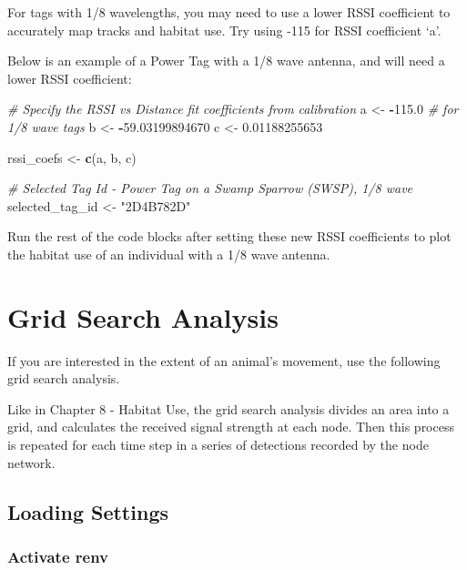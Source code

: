 \documentclass[
]{book}
\newenvironment{Shaded}{\begin{snugshade}}{\end{snugshade}}
\newcommand{\CommentTok}[1]{\textcolor[rgb]{0.56,0.35,0.01}{\textit{#1}}}
\newcommand{\FloatTok}[1]{\textcolor[rgb]{0.00,0.00,0.81}{#1}}
\newcommand{\FunctionTok}[1]{\textcolor[rgb]{0.13,0.29,0.53}{\textbf{#1}}}
\newcommand{\NormalTok}[1]{#1}
\newcommand{\OtherTok}[1]{\textcolor[rgb]{0.56,0.35,0.01}{#1}}
\newcommand{\SpecialCharTok}[1]{\textcolor[rgb]{0.81,0.36,0.00}{\textbf{#1}}}
\newcommand{\StringTok}[1]{\textcolor[rgb]{0.31,0.60,0.02}{#1}}
\begin{document}
For tags with 1/8 wavelengths, you may need to use a lower RSSI coefficient to accurately map tracks and habitat use. Try using -115 for RSSI coefficient `a'.

Below is an example of a Power Tag with a 1/8 wave antenna, and will need a lower RSSI coefficient:

\begin{Shaded}
\begin{Highlighting}[]
\CommentTok{\# Specify the RSSI vs Distance fit coefficients from calibration}
\NormalTok{a }\OtherTok{\textless{}{-}} \SpecialCharTok{{-}}\FloatTok{115.0} \CommentTok{\# for 1/8 wave tags}
\NormalTok{b }\OtherTok{\textless{}{-}} \SpecialCharTok{{-}}\FloatTok{59.03199894670}
\NormalTok{c }\OtherTok{\textless{}{-}} \FloatTok{0.01188255653}

\NormalTok{rssi\_coefs }\OtherTok{\textless{}{-}} \FunctionTok{c}\NormalTok{(a, b, c)}

\CommentTok{\# Selected Tag Id {-} Power Tag on a Swamp Sparrow (SWSP), 1/8 wave}
\NormalTok{selected\_tag\_id }\OtherTok{\textless{}{-}} \StringTok{"2D4B782D"}
\end{Highlighting}
\end{Shaded}

Run the rest of the code blocks after setting these new RSSI coefficients to plot the habitat use of an individual with a 1/8 wave antenna.

\chapter{Grid Search Analysis}\label{grid-search-analysis}

If you are interested in the extent of an animal's movement, use the following grid search analysis.

Like in Chapter 8 - Habitat Use, the grid search analysis divides an area into a grid, and calculates the received signal strength at each node. Then this process is repeated for each time step in a series of detections recorded by the node network.

\section{Loading Settings}\label{loading-settings}

\subsection{Activate renv}\label{activate-renv-1}
\end{document}
